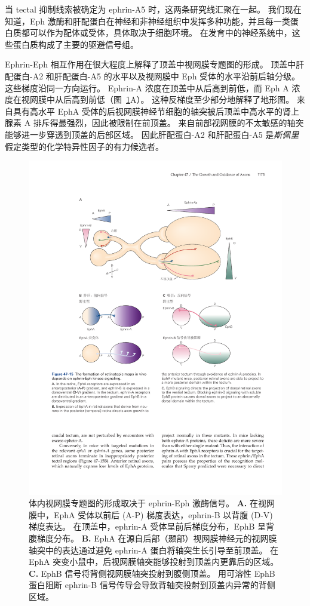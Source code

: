 当 tectal 抑制线索被确定为 ephrin-A5 时，这两条研究线汇聚在一起。
我们现在知道，Eph 激酶和肝配蛋白在神经和非神经组织中发挥多种功能，并且每一类蛋白质都可以作为配体或受体，具体取决于细胞环境。
在发育中的神经系统中，这些蛋白质构成了主要的驱避信号组。


Ephrin-Eph 相互作用在很大程度上解释了顶盖中视网膜专题图的形成。
顶盖中肝配蛋白-A2 和肝配蛋白-A5 的水平以及视网膜中 Eph 受体的水平沿前后轴分级。
这些梯度沿同一方向运行。
Ephrin-A 浓度在顶盖中从后高到前低，而 Eph A 浓度在视网膜中从后高到前低（图~\ref{fig:47_15}A）。
这种反梯度至少部分地解释了地形图。
来自具有高水平 EphA 受体的后视网膜神经节细胞的轴突被后顶盖中高水平的肾上腺素 A 排斥得最强烈，因此被限制在前顶盖。
来自前部视网膜的不太敏感的轴突能够进一步穿透到顶盖的后部区域。
因此肝配蛋白-A2 和肝配蛋白-A5 是\textit{斯佩里}假定类型的化学特异性因子的有力候选者。


\begin{figure}[htbp]
	\centering
	\includegraphics[width=0.8\linewidth]{chap47/fig_47_15}
	\caption{体内视网膜专题图的形成取决于 ephrin-Eph 激酶信号。
		\textbf{A.} 在视网膜中，EphA 受体以前后 (A-P) 梯度表达，ephrin-B 以背腹 (D-V) 梯度表达。 
		在顶盖中，ephrin-A 受体呈前后梯度分布，EphB 呈背腹梯度分布。
		\textbf{B.} EphA 在源自后部（颞部）视网膜神经元的视网膜轴突中的表达通过避免 ephrin-A 蛋白将轴突生长引导至前顶盖。
		在 EphA 突变小鼠中，后视网膜轴突能够投射到顶盖内更靠后的区域。
		\textbf{C.} EphB 信号将背侧视网膜轴突投射到腹侧顶盖。
		用可溶性 EphB 蛋白阻断 ephrin-B 信号传导会导致背轴突投射到顶盖内异常的背侧区域。}
	\label{fig:47_15}
\end{figure}


